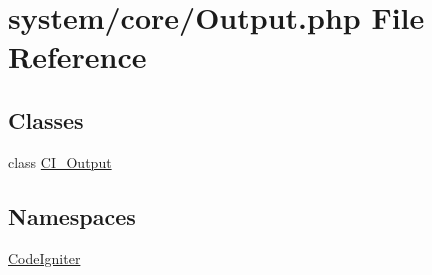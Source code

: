 \hypertarget{_output_8php}{}\section{system/core/\+Output.php File Reference}
\label{_output_8php}
\subsection*{Classes}
\begin{DoxyCompactItemize}
\item 
class \mbox{\hyperlink{class_c_i___output}{C\+I\+\_\+\+Output}}
\end{DoxyCompactItemize}
\subsection*{Namespaces}
\begin{DoxyCompactItemize}
\item 
 \mbox{\hyperlink{namespace_code_igniter}{Code\+Igniter}}
\end{DoxyCompactItemize}
